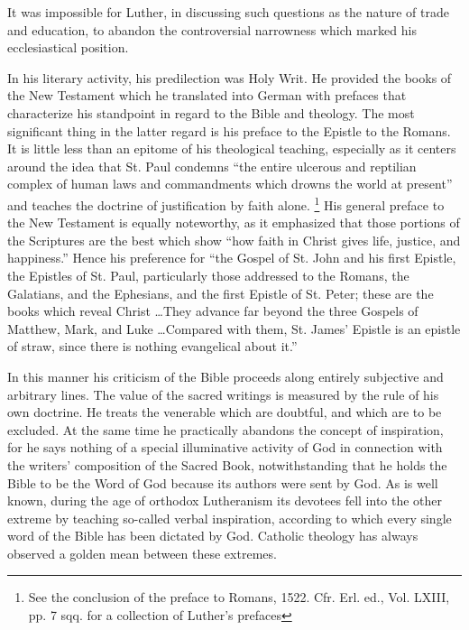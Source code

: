 It was impossible for Luther, in discussing such questions as the
nature of trade and education, to abandon the controversial narrowness
which marked his ecclesiastical position.

In his literary activity, his predilection was Holy Writ. He provided
the books of the New Testament which he translated into German
with prefaces that characterize his standpoint in regard to the Bible
and theology. The most significant thing in the latter regard is his
preface to the Epistle to the Romans. It is little less than an epitome
of his theological teaching, especially as it centers around the idea
that St. Paul condemns “the entire ulcerous and reptilian complex
of human laws and commandments which drowns the world at present”
and teaches the doctrine of justification by faith alone.
\footnote{See the conclusion of the preface to Romans, 1522. Cfr. Erl. ed., Vol. LXIII, pp. 7 sqq.
for a collection of Luther's prefaces}
His
general preface to the New Testament is equally noteworthy, as it
emphasized that those portions of the Scriptures are the best which
show “how faith in Christ gives life, justice, and happiness.” Hence
his preference for “the Gospel of St. John and his first Epistle, the
Epistles of St. Paul, particularly those addressed to the Romans, the
Galatians, and the Ephesians, and the first Epistle of St. Peter; these
are the books which reveal Christ \dots They advance far beyond
the three Gospels of Matthew, Mark, and Luke \dots Compared with
them, St. James' Epistle is an epistle of straw, since there is nothing
evangelical about it.”

In this manner his criticism of the Bible proceeds along entirely
subjective and arbitrary lines. The value of the sacred writings is
measured by the rule of his own doctrine. He treats the venerable
which are doubtful, and which are to be excluded. At the same time
he practically abandons the concept of inspiration, for he says nothing
of a special illuminative activity of God in connection with the
writers’ composition of the Sacred Book, notwithstanding that he
holds the Bible to be the Word of God because its authors were sent
by God. As is well known, during the age of orthodox Lutheranism
its devotees fell into the other extreme by teaching so-called verbal
inspiration, according to which every single word of the Bible has
been dictated by God. Catholic theology has always observed a
golden mean between these extremes.

